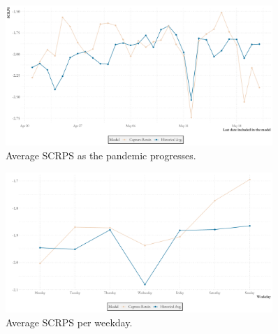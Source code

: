 \begin{figure}
    \centering
    \includegraphics[width=0.9\textwidth]{../plots/SCRPS_over_states}
    \caption{Average SCRPS as the pandemic progresses.}
    \label{fig:SCRPS_states}
\end{figure}

\begin{figure}
    \centering
    \includegraphics[width=0.9\textwidth]{../plots/SCRPS_over_weekdays}
    \caption{Average SCRPS per weekday.}
    \label{fig:SCRPS_weekdays}
\end{figure}